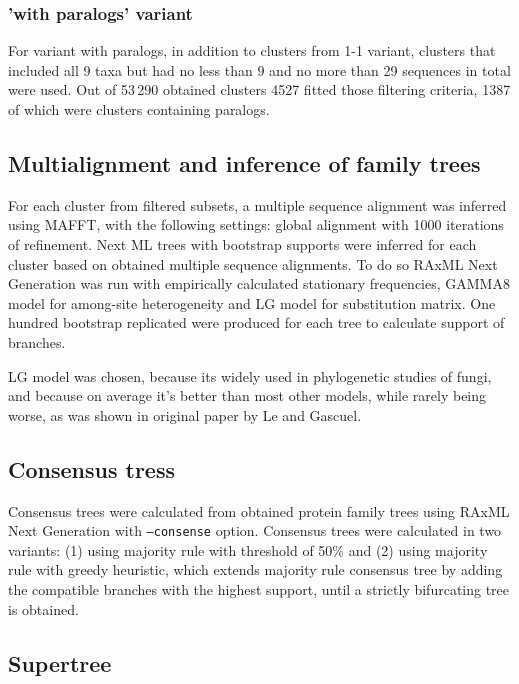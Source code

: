 \documentclass[two column, twoside, a4paper]{article}
\begin{document}
\subsubsection{'with paralogs' variant}

For variant with paralogs, in addition to clusters from 1-1 variant, clusters that included all 9 taxa but had no less than 9 and no more than 29 sequences in total were used. Out of 53\,290 obtained clusters 4527 fitted those filtering criteria, 1387 of which were clusters containing paralogs. 

\subsection{Multialignment and inference of family trees}

For each cluster from filtered subsets, a multiple sequence alignment was inferred using MAFFT\autocite{Katoh2013}, with the following settings: global alignment with 1000 iterations of refinement. Next ML trees with bootstrap supports were inferred for each cluster based on obtained multiple sequence alignments. To do so RAxML Next Generation\autocite{Kozlov2019} was run with empirically calculated stationary frequencies, GAMMA8 model for among-site heterogeneity and LG model\autocite{Le2008} for substitution matrix. One hundred bootstrap replicated were produced for each tree to calculate support of branches. 

LG model was chosen, because its widely used in phylogenetic studies of fungi, and because on average it's better than most other models, while rarely being worse, as was shown in original paper by Le and Gascuel\autocite{Le2008}.

\subsection{Consensus tress}

Consensus trees were calculated from obtained protein family trees using RAxML Next Generation with \texttt{--consense} option. Consensus trees were calculated in two variants: (1) using majority rule with threshold of 50\% and (2) using majority rule with greedy heuristic, which extends majority rule consensus tree by adding the compatible branches with the highest support, until a strictly bifurcating tree is obtained.

\subsection{Supertree}
\end{document}
